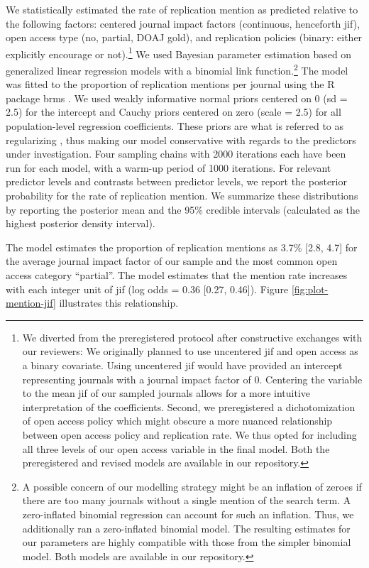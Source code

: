 \documentclass[cm,linguex]{glossa}
\begin{document}
We statistically estimated the rate of replication mention as predicted relative to the following factors:
centered journal impact factors (continuous, henceforth jif), open access type (no, partial, DOAJ gold), and replication policies (binary: either explicitly encourage or not).\footnote{We diverted from the preregistered protocol after constructive exchanges with our reviewers: We originally planned to use uncentered jif and open access as a binary covariate. Using uncentered jif would have provided an intercept representing journals with a journal impact factor of 0. Centering the variable to the mean jif of our sampled journals allows for a more intuitive interpretation of the coefficients. Second, we preregistered a dichotomization of open access policy which might obscure a more nuanced relationship between open access policy and replication rate. We thus opted for including all three levels of our open access variable in the final model. Both the preregistered and revised models are available in our repository.}
We used Bayesian parameter estimation based on generalized linear regression models with a binomial link function.\footnote{A possible concern of our modelling strategy might be an inflation of zeroes if there are too many journals without a single mention of the search term. A zero-inflated binomial regression can account for such an inflation. Thus, we additionally ran a zero-inflated binomial model. The resulting estimates for our parameters are highly compatible with those from the simpler binomial model. Both models are available in our repository.}
The model was fitted to the proportion of replication mentions per journal using the R package brms \citep{burkner_brms_2016}.
We used weakly informative normal priors centered on 0 (sd = 2.5) for the intercept and Cauchy priors centered on zero (scale = 2.5) for all population-level regression coefficients.
These priors are what is referred to as regularizing \citep{gelman_weakly_2008}, thus making our model conservative with regards to the predictors under investigation.
Four sampling chains with 2000 iterations each have been run for each model, with a warm-up period of 1000 iterations.
For relevant predictor levels and contrasts between predictor levels, we report the posterior probability for the rate of replication mention.
We summarize these distributions by reporting the posterior mean and the 95\% credible intervals (calculated as the highest posterior density interval).

The model estimates the proportion of replication mentions as 3.7\% {[}2.8, 4.7{]} for the average journal impact factor of our sample and the most common open access category ``partial''. The model estimates that the mention rate increases with each integer unit of jif (log odds = 0.36 {[}0.27, 0.46{]}).
Figure \ref{fig:plot-mention-jif} illustrates this relationship.
\end{document}
